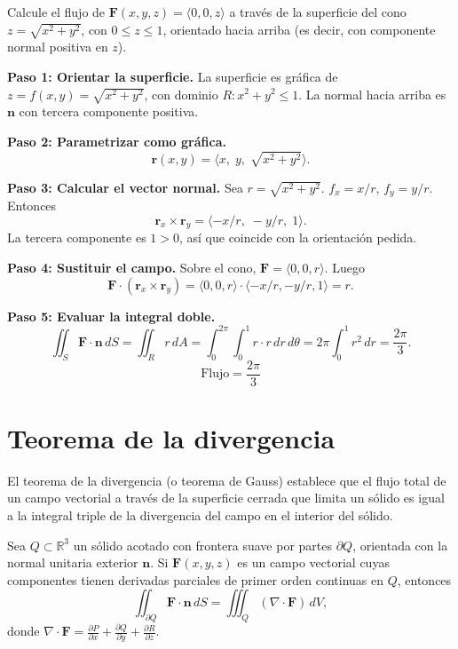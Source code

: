\begin{example}
Calcule el flujo de $\mathbf{F}(x,y,z)=\langle 0,0,z\rangle$ a través de la superficie del cono $z=\sqrt{x^2+y^2}$, con $0\le z\le 1$, orientado hacia arriba (es decir, con componente normal positiva en $z$).
\begin{myproof}
\textbf{Paso 1: Orientar la superficie.}
La superficie es gráfica de $z=f(x,y)=\sqrt{x^2+y^2}$, con dominio $R: x^2+y^2\le 1$. La normal hacia arriba es $\mathbf{n}$ con tercera componente positiva.

\textbf{Paso 2: Parametrizar como gráfica.}
\[
\mathbf{r}(x,y)=\langle x,\; y,\; \sqrt{x^2+y^2} \rangle.
\]

\textbf{Paso 3: Calcular el vector normal.}
Sea $r=\sqrt{x^2+y^2}$. $f_x = x/r$, $f_y = y/r$. Entonces
\[
\mathbf{r}_x \times \mathbf{r}_y = \langle -x/r,\; -y/r,\; 1 \rangle.
\]
La tercera componente es $1>0$, así que coincide con la orientación pedida.

\textbf{Paso 4: Sustituir el campo.}
Sobre el cono, $\mathbf{F} = \langle 0,0,r\rangle$. Luego
\[
\mathbf{F}\cdot(\mathbf{r}_x \times \mathbf{r}_y)
= \langle 0,0,r\rangle \cdot \langle -x/r,-y/r,1\rangle = r.
\]

\textbf{Paso 5: Evaluar la integral doble.}
\[
\iint_S \mathbf{F}\cdot\mathbf{n}\,dS
= \iint_R r\,dA
= \int_0^{2\pi}\int_0^1 r\cdot r\,dr\,d\theta
= 2\pi \int_0^1 r^2\,dr
= \frac{2\pi}{3}.
\]
\[
\boxed{\text{Flujo} = \frac{2\pi}{3}}
\]
\end{myproof}
\end{example}

\section{Teorema de la divergencia}

El teorema de la divergencia (o teorema de Gauss) establece que el flujo total de un campo vectorial a través de la superficie cerrada que limita un sólido es igual a la integral triple de la divergencia del campo en el interior del sólido.

\begin{theorem}
Sea $Q\subset\mathbb{R}^3$ un sólido acotado con frontera suave por partes $\partial Q$, orientada con la normal unitaria exterior $\mathbf{n}$. Si $\mathbf{F}(x,y,z)$ es un campo vectorial cuyas componentes tienen derivadas parciales de primer orden continuas en $Q$, entonces
\[
\iint_{\partial Q} \mathbf{F}\cdot\mathbf{n}\,dS
=
\iiint_Q (\nabla\cdot\mathbf{F})\,dV,
\]
donde $\displaystyle \nabla\cdot\mathbf{F} = \frac{\partial P}{\partial x} + \frac{\partial Q}{\partial y} + \frac{\partial R}{\partial z}$.
\end{theorem}

